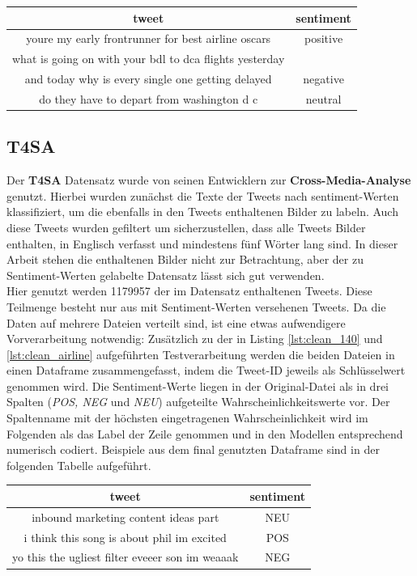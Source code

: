 \begin{center}
\begin{tabular}{|c|c|}
\hline
tweet & sentiment\\ 
\hline\hline
youre my early frontrunner for best airline  oscars&positive\\
\hline
what is going on with your bdl to dca flights yesterday&\\ and today   why is every single one getting delayed&negative\\
\hline
do they have to depart from washington  d  c&neutral\\
\hline    
\end{tabular}
\end{center}

\subsection{T4SA}
\label{sec:t4sa}
Der \textbf{T4SA} Datensatz \cite{t4sa} wurde von seinen Entwicklern zur \textbf{Cross-Media-Analyse} genutzt. Hierbei wurden zun\"achst die Texte der Tweets nach sentiment-Werten klassifiziert, um die ebenfalls in den Tweets enthaltenen Bilder zu labeln. Auch diese Tweets wurden gefiltert um sicherzustellen, dass alle Tweets Bilder enthalten, in Englisch verfasst und mindestens f\"unf W\"orter lang sind. In dieser Arbeit stehen die enthaltenen Bilder nicht zur Betrachtung, aber der zu Sentiment-Werten gelabelte Datensatz l\"asst sich gut verwenden.\\
Hier genutzt werden 1179957 der im Datensatz enthaltenen Tweets. Diese Teilmenge besteht nur aus mit Sentiment-Werten versehenen Tweets. Da die Daten auf mehrere Dateien verteilt sind, ist eine etwas aufwendigere Vorverarbeitung notwendig: Zus\"atzlich zu der in Listing \ref{lst:clean_140} und \ref{lst:clean_airline} aufgef\"uhrten Testverarbeitung werden die beiden Dateien in einen Dataframe zusammengefasst, indem die Tweet-ID jeweils als Schl\"usselwert genommen wird. Die Sentiment-Werte liegen in der Original-Datei als in drei Spalten (\textit{POS, NEG} und \textit{NEU}) aufgeteilte Wahrscheinlichkeitswerte vor. Der Spaltenname mit der h\"ochsten eingetragenen Wahrscheinlichkeit wird im Folgenden als das Label der Zeile genommen und in den Modellen entsprechend numerisch codiert. Beispiele aus dem final genutzten Dataframe sind in der folgenden Tabelle aufgef\"uhrt.
\begin{center}
\begin{tabular}{|c|c|}
\hline
tweet & sentiment\\ 
\hline\hline
inbound marketing content ideas part&NEU\\
\hline
i think this song is about phil im excited&POS\\
\hline
yo this the ugliest filter eveeer son  im weaaak&NEG\\
\hline    
\end{tabular}
\end{center}


